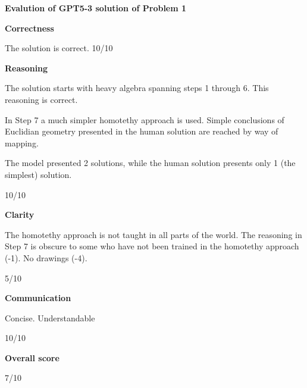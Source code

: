 \documentclass{article}
\begin{document}
{\bf Evalution of GPT5-3 solution of Problem 1}

{\bf Correctness}

The solution is correct. 10/10

{\bf Reasoning}

The solution starts with heavy algebra spanning steps 1 through 6. This reasoning is correct.

In Step 7 a much simpler homotethy approach is used. Simple conclusions of Euclidian geometry presented in the human solution are reached by way of mapping.

The model presented 2 solutions, while the human solution presents only 1 (the simplest) solution.

10/10

{\bf Clarity}

The homotethy approach is not taught in all parts of the world. The reasoning in Step 7 is obscure to some who have not been trained in the homotethy approach (-1). 
No drawings (-4).

5/10

{\bf Communication}

Concise. Understandable

10/10

{\bf Overall score}

7/10
\end{document}
